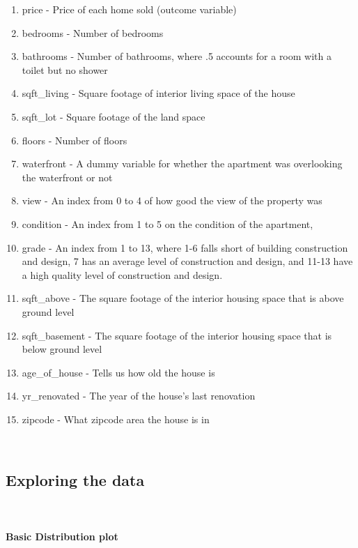 \documentclass[
]{article}
\begin{document}
\begin{enumerate}
\def\labelenumi{\arabic{enumi}.}
\item
  price - Price of each home sold (outcome variable)
\item
  bedrooms - Number of bedrooms
\item
  bathrooms - Number of bathrooms, where .5 accounts for a room with a
  toilet but no shower
\item
  sqft\_living - Square footage of interior living space of the house
\item
  sqft\_lot - Square footage of the land space
\item
  floors - Number of floors
\item
  waterfront - A dummy variable for whether the apartment was
  overlooking the waterfront or not
\item
  view - An index from 0 to 4 of how good the view of the property was
\item
  condition - An index from 1 to 5 on the condition of the apartment,
\item
  grade - An index from 1 to 13, where 1-6 falls short of building
  construction and design, 7 has an average level of construction and
  design, and 11-13 have a high quality level of construction and
  design.
\item
  sqft\_above - The square footage of the interior housing space that is
  above ground level
\item
  sqft\_basement - The square footage of the interior housing space that
  is below ground level
\item
  age\_of\_house - Tells us how old the house is
\item
  yr\_renovated - The year of the house's last renovation
\item
  zipcode - What zipcode area the house is in
\end{enumerate}

~

\hypertarget{exploring-the-data}{%
\subsection{Exploring the data}\label{exploring-the-data}}

~

\hypertarget{basic-distribution-plot}{%
\paragraph{Basic Distribution plot}\label{basic-distribution-plot}}
\end{document}
